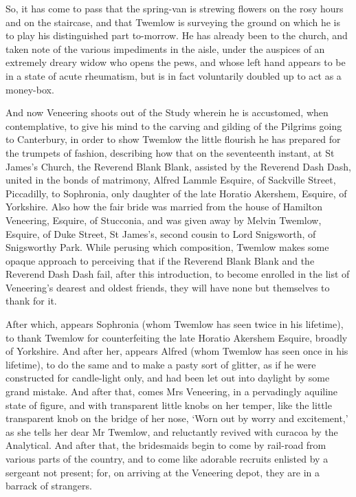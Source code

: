 So, it has come to pass that the spring-van is strewing flowers on
the rosy hours and on the staircase, and that Twemlow is surveying the
ground on which he is to play his distinguished part to-morrow. He has
already been to the church, and taken note of the various impediments in
the aisle, under the auspices of an extremely dreary widow who opens the
pews, and whose left hand appears to be in a state of acute rheumatism,
but is in fact voluntarily doubled up to act as a money-box.

And now Veneering shoots out of the Study wherein he is accustomed,
when contemplative, to give his mind to the carving and gilding of
the Pilgrims going to Canterbury, in order to show Twemlow the little
flourish he has prepared for the trumpets of fashion, describing how
that on the seventeenth instant, at St James’s Church, the Reverend
Blank Blank, assisted by the Reverend Dash Dash, united in the bonds of
matrimony, Alfred Lammle Esquire, of Sackville Street, Piccadilly,
to Sophronia, only daughter of the late Horatio Akershem, Esquire,
of Yorkshire. Also how the fair bride was married from the house of
Hamilton Veneering, Esquire, of Stucconia, and was given away by Melvin
Twemlow, Esquire, of Duke Street, St James’s, second cousin to Lord
Snigsworth, of Snigsworthy Park. While perusing which composition,
Twemlow makes some opaque approach to perceiving that if the Reverend
Blank Blank and the Reverend Dash Dash fail, after this introduction, to
become enrolled in the list of Veneering’s dearest and oldest friends,
they will have none but themselves to thank for it.

After which, appears Sophronia (whom Twemlow has seen twice in his
lifetime), to thank Twemlow for counterfeiting the late Horatio Akershem
Esquire, broadly of Yorkshire. And after her, appears Alfred (whom
Twemlow has seen once in his lifetime), to do the same and to make a
pasty sort of glitter, as if he were constructed for candle-light only,
and had been let out into daylight by some grand mistake. And after
that, comes Mrs Veneering, in a pervadingly aquiline state of figure,
and with transparent little knobs on her temper, like the little
transparent knob on the bridge of her nose, ‘Worn out by worry and
excitement,’ as she tells her dear Mr Twemlow, and reluctantly revived
with curacoa by the Analytical. And after that, the bridesmaids begin
to come by rail-road from various parts of the country, and to come like
adorable recruits enlisted by a sergeant not present; for, on arriving
at the Veneering depot, they are in a barrack of strangers.

